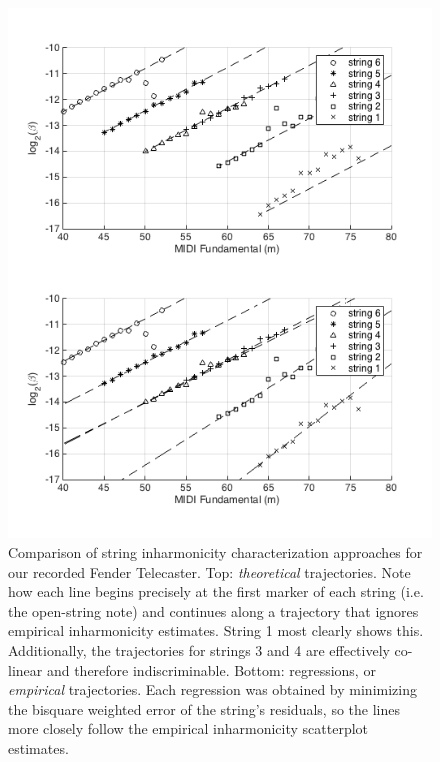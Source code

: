 \documentclass[12pt]{cmuthesis}
\begin{document}
\begin{figure}[!htbp] 
\centering
\includegraphics[scale=0.75]{traj-v-reg}
\caption{Comparison of string inharmonicity characterization approaches for our recorded Fender Telecaster. Top: \textit{theoretical} trajectories. Note how each line begins precisely at the first marker of each string (i.e. the open-string note) and continues along a trajectory that ignores empirical inharmonicity estimates. String 1 most clearly shows this. Additionally, the trajectories for strings 3 and 4 are effectively co-linear and therefore indiscriminable. Bottom: regressions, or \textit{empirical} trajectories. Each regression was obtained by minimizing the bisquare weighted error of the string's residuals, so the lines more closely follow the empirical inharmonicity scatterplot estimates.}
\label{fig:traj-v-reg}
\end{figure}
\end{document}
